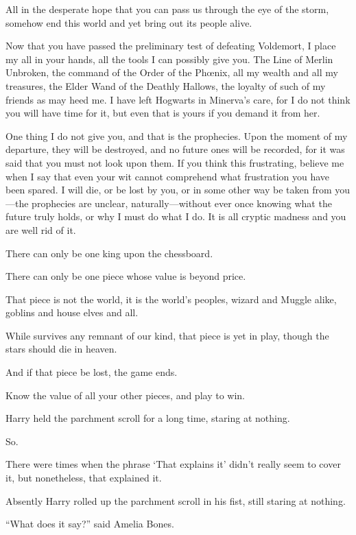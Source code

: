 \begin{writtenNote}
All in the desperate hope that you can pass us through the eye of the storm, somehow end this world and yet bring out its people alive.

Now that you have passed the preliminary test of defeating Voldemort, I place my all in your hands, all the tools I can possibly give you. The Line of Merlin Unbroken, the command of the Order of the Phœnix, all my wealth and all my treasures, the Elder Wand of the Deathly Hallows, the loyalty of such of my friends as may heed me. I have left Hogwarts in Minerva’s care, for I do not think you will have time for it, but even that is yours if you demand it from her.

One thing I do not give you, and that is the prophecies. Upon the moment of my departure, they will be destroyed, and no future ones will be recorded, for it was said that you must not look upon them. If you think this frustrating, believe me when I say that even your wit cannot comprehend what frustration you have been spared. I will die, or be lost by you, or in some other way be taken from you—the prophecies are unclear, naturally—without ever once knowing what the future truly holds, or why I must do what I do. It is all cryptic madness and you are well rid of it.

There can only be one king upon the chessboard.

There can only be one piece whose value is beyond price.

That piece is not the world, it is the world’s peoples, wizard and Muggle alike, goblins and house elves and all.

While survives any remnant of our kind, that piece is yet in play, though the stars should die in heaven.

And if that piece be lost, the game ends.

Know the value of all your other pieces, and play to win.

\end{writtenNote}

\later

Harry held the parchment scroll for a long time, staring at nothing.

So.

There were times when the phrase ‘That explains it’ didn’t really seem to cover it, but nonetheless, that explained it.

Absently Harry rolled up the parchment scroll in his fist, still staring at nothing.

“What does it say?” said Amelia Bones.

